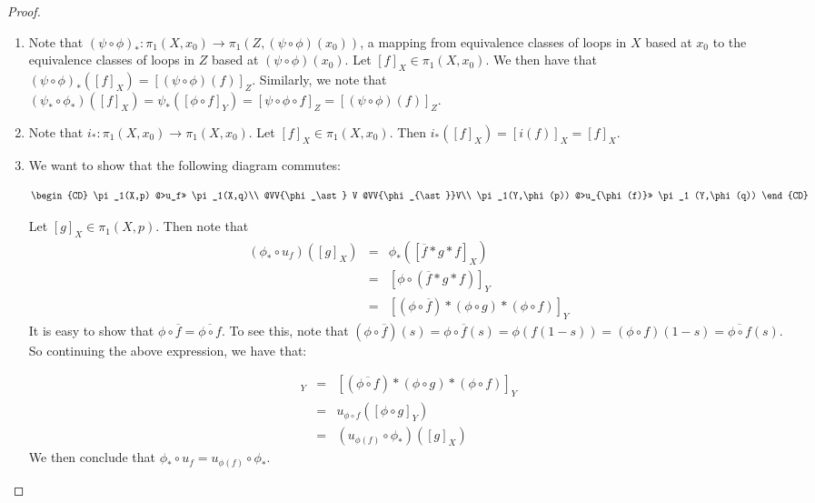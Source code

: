 \begin{proof}
\begin{enumerate}
	\item Note that $(\psi \circ \phi)_\ast : \pi_1(X,x_0 ) \to \pi_1(Z,(\psi \circ \phi)(x_0) )$, a mapping from equivalence classes of loops in $X$ based at $x_0$ to the equivalence classes of loops in $Z$ based at $(\psi\circ \phi)(x_0)$. Let $[f]_X \in \pi_1(X,x_0)$.
We then have that $(\psi \circ \phi)_\ast ([f]_X) = [(\psi \circ \phi)(f)]_Z$. Similarly, we note that $(\psi_\ast \circ \phi_\ast ) ([f]_X)  = \psi_\ast ([\phi\circ f]_Y) = [\psi \circ \phi \circ f ]_Z = [(\psi \circ \phi)(f) ]_Z$. 
	\item Note that $i_\ast : \pi_1 (X,x_0) \to \pi_1 (X,x_0)$. Let $[f]_X \in \pi_1(X,x_0)$. Then $i_\ast ([f]_X) = [i(f)]_X = [f]_X$. 
	\item We want to show that the following diagram commutes:

$$
\begin{CD}
\pi_1(X,p) @>u_f>> \pi_1(X,q)\\
@VV{\phi_\ast} V @VV{\phi_{\ast}}V\\
\pi_1(Y,\phi(p)) @>u_{\phi(f)}>> \pi_1 (Y,\phi(q))
\end{CD}
$$

Let $[g]_X\in \pi_1(X,p)$. Then note that
\begin{eqnarray*}
(\phi_\ast \circ u_f)([g]_X) &=& \phi_\ast ([\overline{f}\ast g \ast f]_X) \\
&= &[ \phi \circ(\overline{f} \ast g \ast f) ]_Y\\
&=& [(\phi\circ \overline{f}) \ast (\phi \circ g) \ast (\phi\circ f) ] _Y
\end{eqnarray*}
It is easy to show that $\phi \circ \overline{f} = \overline{\phi \circ f}$. To see this, note that
$(\phi \circ \overline{f})(s) = \phi \circ \overline{f}(s) = \phi (f(1-s)) = (\phi \circ f) (1-s) = \overline{\phi \circ f}(s)$. So continuing the above expression, we have that:

\begin{eqnarray*}[(\phi\circ \overline{f}) \ast (\phi \circ g) \ast (\phi\circ f) ] _Y&=& [ (\overline{\phi \circ f}) \ast (\phi \circ g) \ast (\phi \circ f) ] _Y \\
&=& u_{\phi\circ f} ([\phi \circ g]_Y)\\
& =& (u_{\phi(f)} \circ \phi_\ast )([g]_X)
\end{eqnarray*}
We then conclude that $\phi_\ast \circ u_f = u_{\phi(f)} \circ \phi_\ast$.
\end{enumerate}
\end{proof}

